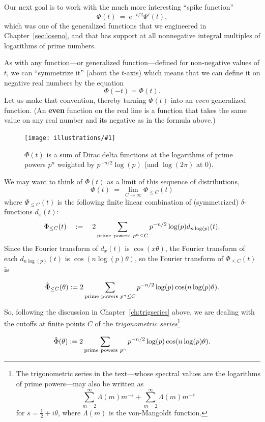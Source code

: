 \documentclass[openany]{book}
\newcommand{\ill}[3]{%
   \begin{figure}[H]%
   \vspace{-2ex}
   \centering%
   \texttt{[image: illustrations/\#1]}%
   \caption{#3}%
   \vspace{-2ex}
    \end{figure}}
\theoremstyle{plain}
\theoremstyle{definition}
\begin{document}
{Our next goal is to work with the much more interesting ``spike
function'' $$\Phi(t) \ = \ e^{- t/2}\Psi'(t),$$ which was one of the
generalized functions that we engineered in Chapter~\ref{sec:loseno},
and that has support at all nonnegative integral multiples of
logarithms of prime numbers.




As with any function---or generalized function---defined for
non-negative values of $t$, we can ``symmetrize it'' (about the
$t$-axis) which means that we can define it on negative real numbers
by the equation
  $$\Phi(-t) = \Phi(t).$$
  Let us make that convention, thereby turning $\Phi(t)$ into an {\it
    even} generalized function. (An {\bf even} function on the real line is a function that takes the same value on any real number and its negative as in the formula above.)

\ill{bigPhi}{1}{$\Phi(t)$ is a sum of Dirac delta functions at the logarithms of prime powers $p^n$ weighted by $p^{-n/2}\log(p)$ (and $\log(2\pi)$ at $0$).}


We may want to think of $\Phi(t)$ as a limit of this sequence of distributions,
 $$\Phi(t)\ = \ \lim_{C \to {\infty}}\Phi_{\le C}(t)$$
where $\Phi_{\le C}(t)$  is the following finite linear
combination of (symmetrized) $\delta$-functions  $d_x(t)$:
 $$\Phi_{\le C}(t)\quad :=\quad  2\sum_{{\rm prime\ powers \ }p^n  \le C} p^{-n/2}\log(p)d_{n\log(p)}(t).$$
 Since the Fourier transform of $d_x(t)$ is  $\cos(x\theta)$, the Fourier transform of  each $d_{n\log(p)}(t)$ is
 $\cos(n\log(p)\theta)$, so the Fourier transform of
 $\Phi_{\le C}(t)$ is

  $${\hat \Phi}_{\leq C}(\theta):= 2\sum_{{\rm prime\ powers\ }p^n  \leq{} C} p^{-n/2} \log(p)\cos(n\log(p)\theta).$$

   So, following the discussion in Chapter~\ref{ch:trigseries} above, we are dealing with the cutoffs at finite points  $C$  of the {\it trigonometric series}{\footnote{The trigonometric series in the text---whose spectral values are the logarithms of prime powers---may also be written as
   $$\sum_{m=2}^{\infty}\Lambda(m)m^{-s} + \sum_{m=2}^{\infty}\Lambda(m)m^{-{\bar s}}$$ for $s={\frac{1}{2}}+i\theta$, where  $\Lambda(m)$ is the von-Mangoldt function.}}

   $${\hat \Phi}(\theta):= 2\sum_{{\rm prime\ powers\ }p^n } p^{-n/2} \log(p)\cos(n\log(p)\theta).$$




}
\end{document}
